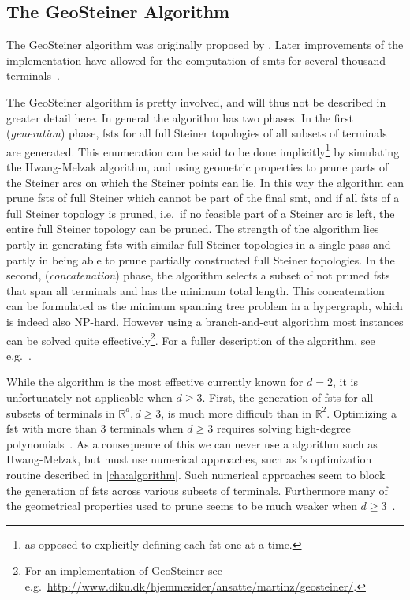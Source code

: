 \subsection{The GeoSteiner Algorithm}
\label{sec:geosteiner-algorithm}


The GeoSteiner algorithm was originally proposed by \textcite{winter1985}. Later
improvements of the implementation have allowed for the computation of \acp{smt}
for several thousand terminals~\cite{brazil2015}.

The GeoSteiner algorithm is pretty involved, and will thus not be described in
greater detail here. In general the algorithm has two phases. In the first
(\textit{generation}) phase, \acp{fst} for all full Steiner topologies of all
subsets of terminals are generated. This enumeration can be said to be done
implicitly\footnote{as opposed to explicitly defining each \ac{fst} one at a
  time.} by simulating the Hwang-Melzak algorithm, and using geometric
properties to prune parts of the Steiner arcs on which the Steiner points can
lie. In this way the algorithm can prune \acp{fst} of full Steiner which cannot
be part of the final \ac{smt}, and if all \acp{fst} of a full Steiner topology
is pruned, i.e.\ if no feasible part of a Steiner arc is left, the entire full
Steiner topology can be pruned. The strength of the algorithm lies partly in
generating \acp{fst} with similar full Steiner topologies in a single pass and
partly in being able to prune partially constructed full Steiner topologies. In
the second, (\textit{concatenation}) phase, the algorithm selects a subset of
not pruned \acp{fst} that span all terminals and has the minimum total
length. This concatenation can be formulated as the minimum spanning tree
problem in a hypergraph, which is indeed also NP-hard. However using a
branch-and-cut algorithm most instances can be solved quite
effectively\footnote{For an implementation of GeoSteiner see e.g.\
  \url{http://www.diku.dk/hjemmesider/ansatte/martinz/geosteiner/}.}. For a
fuller description of the algorithm, see e.g.\ \textcite[sec.~1.4]{brazil2015}.

While the algorithm is the most effective currently known for $d = 2$, it is
unfortunately not applicable when $d \ge 3$. First, the generation of \acp{fst}
for all subsets of terminals in $\mathbb{R}^d, d \ge 3$, is much more difficult
than in $\mathbb{R}^2$. Optimizing a \ac{fst} with more than $3$ terminals when
$d \ge 3$ requires solving high-degree polynomials~\cite{smith1992}. As a
consequence of this we can never use a algorithm such as Hwang-Melzak, but must
use numerical approaches, such as \citeauthor{smith1992}'s optimization routine
described in \cref{cha:algorithm}. Such numerical approaches seem to block the
generation of \acp{fst} across various subsets of terminals. Furthermore many of
the geometrical properties used to prune seems to be much weaker when
$d \ge 3$~\cite{fonseca2014}.

